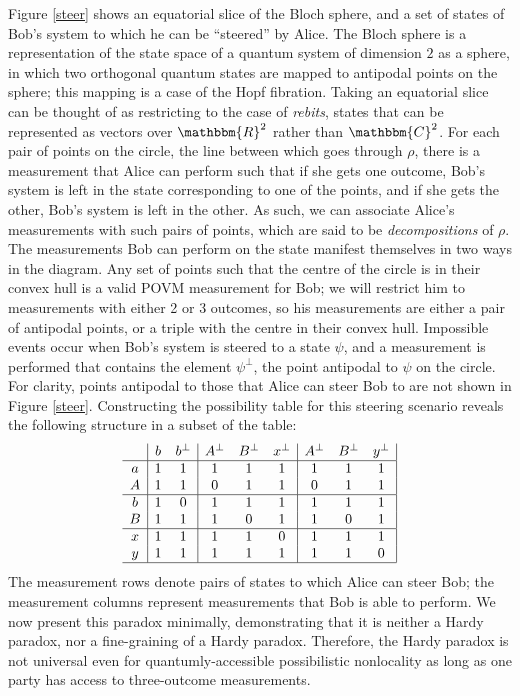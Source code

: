 \documentclass[reprint]{revtex4-1}
\theoremstyle{definition}
\begin{document}
Figure \ref{steer} shows an equatorial slice of the Bloch sphere, and a set of states of Bob's system to which he can be ``steered'' by Alice.  The Bloch sphere is a representation of the state space of a quantum system of dimension $2$ as a sphere, in which two orthogonal quantum states are mapped to antipodal points on the sphere; this mapping is a case of the Hopf fibration. Taking an equatorial slice can be thought of as restricting to the case of \emph{rebits}, states that can be represented as vectors over $\mathbbm{R}^2$ rather than $\mathbbm{C}^2$.
For each pair of points on the circle, the line between which goes through $\rho$, there is a measurement that Alice can perform such that if she gets one outcome, Bob's system is left in the state corresponding to one of the points, and if she gets the other, Bob's system is left in the other. As such, we can associate Alice's measurements with such pairs of points, which are said to be \emph{decompositions} of $\rho$. The measurements Bob can perform on the state manifest themselves in two ways in the diagram. Any set of points such that the centre of the circle is in their convex hull is a valid POVM measurement for Bob; we will restrict him to measurements with either 2 or 3 outcomes, so his measurements are either a pair of antipodal points, or a triple with the centre in their convex hull. Impossible events occur when Bob's system is steered to a state $\psi$, and a measurement is performed that contains the element $\psi^\perp$, the point antipodal to $\psi$ on the circle. For clarity, points antipodal to those that Alice can steer Bob to are not shown in Figure \ref{steer}. Constructing the possibility table for this steering scenario reveals the following structure in a subset of the table:
\begin{equation*}
\begin{array}{ c  | c c | c c c| c c c|}\
  & b&b^\perp& A^\perp &B^\perp&x^\perp& A^\perp &B^\perp&y^\perp \\ \hline
  a &1&1&1&1&1&1&1&1\\ 
  A &1&1&0&1&1&0&1&1\\ \hline
  b &1&0&1&1&1&1&1&1\\ 
 B  &1&1&1&0&1&1&0&1\\ \hline
 x &1&1&1&1&0&1&1&1\\ 
 y &1&1&1&1&1&1&1&0\\ \hline
\end{array}
\end{equation*}
The measurement rows denote pairs of states to which Alice can steer Bob; the measurement columns represent measurements that Bob is able to perform.
We now present this paradox minimally, demonstrating that it is neither a Hardy paradox, nor a fine-graining of a Hardy paradox. Therefore, the Hardy paradox is not universal even for quantumly-accessible possibilistic nonlocality as long as one party has access to three-outcome measurements. 
\end{document}
